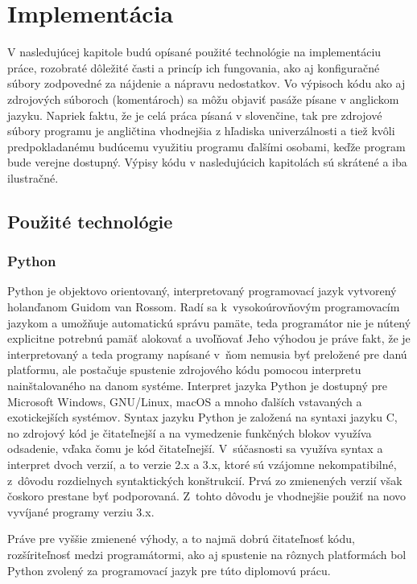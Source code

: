 \chapter{Implementácia}
V nasledujúcej kapitole budú opísané použité technológie na implementáciu práce, rozobraté dôležité časti a princíp ich fungovania, ako aj konfiguračné súbory zodpovedné za nájdenie a nápravu nedostatkov. Vo výpisoch kódu ako aj zdrojových súboroch (komentároch) sa môžu objaviť pasáže písane v anglickom jazyku. Napriek faktu, že je celá práca písaná v slovenčine, tak pre zdrojové súbory programu je angličtina vhodnejšia z hľadiska univerzálnosti a tiež kvôli predpokladanému budúcemu využitiu programu ďalšími osobami, keďže program bude verejne dostupný. Výpisy kódu v nasledujúcich kapitolách sú skrátené a iba ilustračné.

\section{Použité technológie}
 \subsection{Python}
 Python \cite{B4mfUgNUpPnXbiEr} je objektovo orientovaný, interpretovaný programovací jazyk vytvorený holanďanom Guidom van Rossom. Radí sa k~vysokoúrovňovým programovacím jazykom a umožňuje automatickú správu pamäte, teda programátor nie je nútený explicitne potrebnú pamäť alokovať a uvoľňovať Jeho výhodou je práve fakt, že je interpretovaný a teda programy napísané v~ňom nemusia byť preložené pre danú platformu, ale postačuje spustenie zdrojového kódu pomocou interpretu nainštalovaného na danom systéme. Interpret jazyka Python je dostupný pre Microsoft Windows, GNU/Linux, macOS a mnoho ďalších vstavaných a exotickejších systémov. Syntax jazyku Python je založená na syntaxi jazyku C, no zdrojový kód je čitateľnejší a na vymedzenie funkčných blokov využíva odsadenie, vďaka čomu je kód čitateľnejší. V~súčasnosti sa využíva syntax a interpret dvoch verzií, a to verzie 2.x a 3.x, ktoré sú vzájomne nekompatibilné, z~dôvodu rozdielnych syntaktických konštrukcií. Prvá zo zmienených verzií však čoskoro prestane byť podporovaná. Z~tohto dôvodu je vhodnejšie použiť na novo vyvíjané programy verziu 3.x. 
  
 Práve pre vyššie zmienené výhody, a to najmä dobrú čitateľnosť kódu, rozšíriteľnosť  medzi programátormi, ako aj spustenie na rôznych platformách bol Python zvolený za programovací jazyk pre túto diplomovú prácu.
